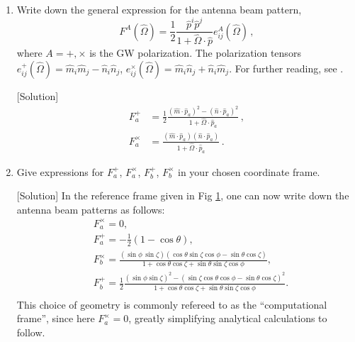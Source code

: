 \documentclass[article, onecolumn, ,nofootinbib,nopreprintnumbers]{revtex4}
\begin{document}
\begin{enumerate}
\begin{figure}[h]
		\label{fig:geometry}
	\end{figure}
\item Write down the general expression for the antenna beam pattern, 
\begin{equation}
F^A(\hat \Omega) = \frac{1}{2} \frac{\hat p^i \hat p^j}{1+\hat\Omega\cdot\hat p} e^A_{ij}(\hat\Omega) \, ,  
\end{equation}
where $A=+,\times$ is the GW polarization. The polarization tensors $e^+_{ij}(\hat \Omega) = \hat m_i\hat m_j - \hat n_i \hat n_j$, $e^\times_{ij} (\hat \Omega)= \hat m_i \hat n_j + \hat n_i \hat m_j$. For further reading, see \cite{AllenRomano:1999, Anholm:09}. 


[Solution]
\begin{subequations}
\begin{align}
F^+_a &= \frac{1}{2} \frac{(\hat m \cdot \hat p_a)^2-(\hat n \cdot \hat p_a)^2}{1+\hat\Omega\cdot\hat p_a}\, ,\\
F^\times_a &= \frac{(\hat m \cdot \hat p_a)(\hat n \cdot \hat p_a)}{1+\hat\Omega\cdot\hat p_a}\, .
\end{align}
\end{subequations}

\item Give expressions for $F^+_a$, $F^\times_a$, $F^+_b$, $F^\times_b$ in your chosen coordinate frame.

[Solution]
In the reference frame given in Fig \ref{fig:geometry}, one can now write down the antenna beam patterns as follows:
\begin{subequations}
	\label{e:F+Fx_comp}
	\begin{align}
	&F^\times_a=0,\\ 	
	& F^+_a=-\frac{1}{2}(1-\cos\theta),\\
	&F^\times_b\!\!=\! \!\frac{(\sin\phi\,\sin\zeta\!)(\cos\theta\!\sin\zeta\!\cos\phi\!-\!\sin\theta\!\cos\zeta\!)}{1\!+\!\cos\theta\!\cos\zeta+\sin\theta\!\sin\zeta\cos\phi},\\
	&F^+_b\!\!=\!\!\frac{1}{2}\frac{(\sin\phi\sin\zeta\!)^2\!\!-\!(\sin\zeta\!\cos\theta\!\cos\phi-\sin\theta\!\cos\zeta\!)^2}{\!1\!+\!\cos\theta\cos\zeta+\sin\theta\sin\zeta\cos\phi}.\nonumber\\
	\end{align}
\end{subequations}
This choice of geometry is commonly refereed to as the ``computational frame'', since here $F_a^\times = 0$, greatly simplifying analytical calculations to follow.
	

\end{enumerate}
\end{document}
